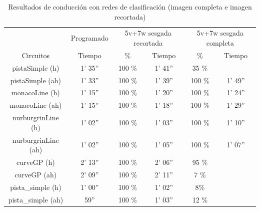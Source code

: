 \begin{table}[H]
\centering
\caption{Resultados de conducción con redes de clasificación (imagen completa e imagen recortada)}
\label{resultados_completa_recortada}
\begin{tabular}{c|c|c|c|c|c||}
\cline{2-6}
                          & \multicolumn{1}{c|}{Programado} & \multicolumn{2}{c|}{5v+7w sesgada recortada} & \multicolumn{2}{c|}{5v+7w sesgada completa} \\ \cline{1-6} 
                        \multicolumn{1}{|c|}{Circuitos}    & Tiempo       & \%       & Tiempo       & \%        & Tiempo       \\ \hline
\multicolumn{1}{|c|}{pistaSimple (h)}    & 1' 35''           & 100 \%         & 1' 41''            & 35 \%           &                 \\ \hline
\multicolumn{1}{|c|}{pistaSimple (ah)}     & 1' 33''           & 100 \%          & 1' 39''            & 100 \%           & 1' 49''               \\ \hline
\multicolumn{1}{|c|}{monacoLine (h)}      & 1' 15''           & 100 \%           & 1' 20''            & 100 \%       & 1' 24''             \\ \hline
\multicolumn{1}{|c|}{monacoLine (ah)}       & 1' 15''            & 100 \%       & 1' 18''            & 100 \%           & 1' 29''                  \\ \hline
\multicolumn{1}{|c|}{nurburgrinLine (h)}      & 1' 02''            & 100 \%          & 1' 03''            & 100 \%        & 1' 10''                 \\ \hline
\multicolumn{1}{|c|}{nurburgrinLine (ah)}       & 1' 02''           & 100 \%           & 1' 05''           & 100 \%        & 1' 07''              \\ \hline
\multicolumn{1}{|c|}{curveGP (h)}     & 2' 13''           & 100 \%           & 2' 06''            & 95 \%        &                  \\ \hline
\multicolumn{1}{|c|}{curveGP (ah)}       & 2' 09''            & 100 \%         & 2' 11''            & 7 \%        &            \\ \hline
\multicolumn{1}{|c|}{pista\_simple (h)}       & 1' 00''           & 100 \%          & 1' 02''            & 8\%        &              \\ \hline
\multicolumn{1}{|c|}{pista\_simple (ah)}     & 59''            & 100 \%          & 1' 03''          & 12 \%        &                  \\ \hline
\end{tabular}
\end{table}



